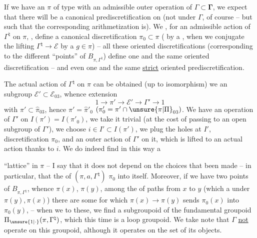 

If we have an  $\pi$ of type  with an admissible outer operation of $\Gamma\subset\boldsymbol{\Gamma}$, we expect that there will be a canonical  prediscretification on  (not  under $\Gamma$, of course \unsure{!|)} -- but such that the corresponding arithmetization is). We  , for an admissible  action of $\Gamma^{\natural}$ on $\pi$, , define a canonical   discretification $\pi_0\subset\pi$ ( by a , when we conjugate  the lifting $\Gamma^{\natural}\to\mathcal E$ by a $g\in\pi$) -- all these oriented discretifications (corresponding to the different ``points'' of $B_{\pi,\Gamma^{\natural}}$) define one and the same oriented discretification -- and even one and the same \uline{strict} oriented prediscretification.

The actual action of $\Gamma^{\natural}$ on $\pi$ can be obtained (up to isomorphism)  we  an  subgroup $\mathcal E'\subset\mathcal E_{03}$, whence extension
\[
1\to\pi'\to\mathcal E'\to\Gamma'\to1
\]
with $\pi'\subset\widehat{\pi}_{03}$, hence $\pi'=\widehat{\pi}'_0$ $(\pi'_0=\pi'\cap\unsure{\pi|\Pi}_{03})$. We have an operation of $\Gamma'$ on $I(\pi')=I(\pi'_0)$, we take it trivial (at the cost of passing to an open subgroup of $\Gamma'$), we choose $i\in I'\subset I(\pi')$, we plug the holes at $I'$,    discretification $\pi_0$, and an outer action of $\Gamma'$ on it, which is lifted to an actual action thanks to $i$. We do indeed find in this way a



``lattice''  in $\pi$ -- I say that it does not depend on the choices that  been made -- in particular, that the  of $(\pi,a,\Gamma^{\natural})$  $\pi_0$ into itself. Moreover, if we have two points  of $B_{\pi,\Gamma^{\natural}}$, whence $\pi(x)$, $\pi(y)$, among the  of paths from $x$ to $y$ (which  a  under $\pi(y),\pi(x)$) there are some for which  $\pi(x)\to\pi(y)$ sends $\pi_0(x)$ into $\pi_0(y)$, -- when we   to these, we find a subgroupoid of the fundamental groupoid $\Pi_{\unsure{1|\cdot}}(\pi,\Gamma^{\natural})$, which this time is a \uline{} loop groupoid. We  take note that $\Gamma$  \uline{not} operate on this groupoid, although it operates on the set of its objects.

